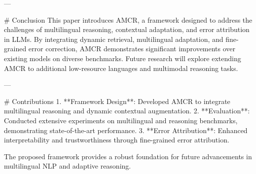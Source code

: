 ---

# Conclusion  
This paper introduces AMCR, a framework designed to address the challenges of multilingual reasoning, contextual adaptation, and error attribution in LLMs. By integrating dynamic retrieval, multilingual adaptation, and fine-grained error correction, AMCR demonstrates significant improvements over existing models on diverse benchmarks. Future research will explore extending AMCR to additional low-resource languages and multimodal reasoning tasks.  

---

# Contributions  
1. **Framework Design**: Developed AMCR to integrate multilingual reasoning and dynamic contextual augmentation.  
2. **Evaluation**: Conducted extensive experiments on multilingual and reasoning benchmarks, demonstrating state-of-the-art performance.  
3. **Error Attribution**: Enhanced interpretability and trustworthiness through fine-grained error attribution.  

The proposed framework provides a robust foundation for future advancements in multilingual NLP and adaptive reasoning.